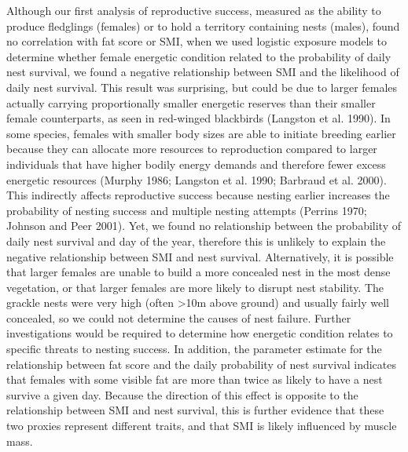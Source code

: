 \documentclass[
]{article}
\begin{document}
Although our first analysis of reproductive success, measured as the
ability to produce fledglings (females) or to hold a territory
containing nests (males), found no correlation with fat score or SMI,
when we used logistic exposure models to determine whether female
energetic condition related to the probability of daily nest survival,
we found a negative relationship between SMI and the likelihood of daily
nest survival. This result was surprising, but could be due to larger
females actually carrying proportionally smaller energetic reserves than
their smaller female counterparts, as seen in red-winged blackbirds
(Langston et al. 1990). In some species, females with smaller body sizes
are able to initiate breeding earlier because they can allocate more
resources to reproduction compared to larger individuals that have
higher bodily energy demands and therefore fewer excess energetic
resources (Murphy 1986; Langston et al. 1990; Barbraud et al. 2000).
This indirectly affects reproductive success because nesting earlier
increases the probability of nesting success and multiple nesting
attempts (Perrins 1970; Johnson and Peer 2001). Yet, we found no
relationship between the probability of daily nest survival and day of
the year, therefore this is unlikely to explain the negative
relationship between SMI and nest survival. Alternatively, it is
possible that larger females are unable to build a more concealed nest
in the most dense vegetation, or that larger females are more likely to
disrupt nest stability. The grackle nests were very high (often
\textgreater10m above ground) and usually fairly well concealed, so we
could not determine the causes of nest failure. Further investigations
would be required to determine how energetic condition relates to
specific threats to nesting success. In addition, the parameter estimate
for the relationship between fat score and the daily probability of nest
survival indicates that females with some visible fat are more than
twice as likely to have a nest survive a given day. Because the
direction of this effect is opposite to the relationship between SMI and
nest survival, this is further evidence that these two proxies represent
different traits, and that SMI is likely influenced by muscle mass.
\end{document}
